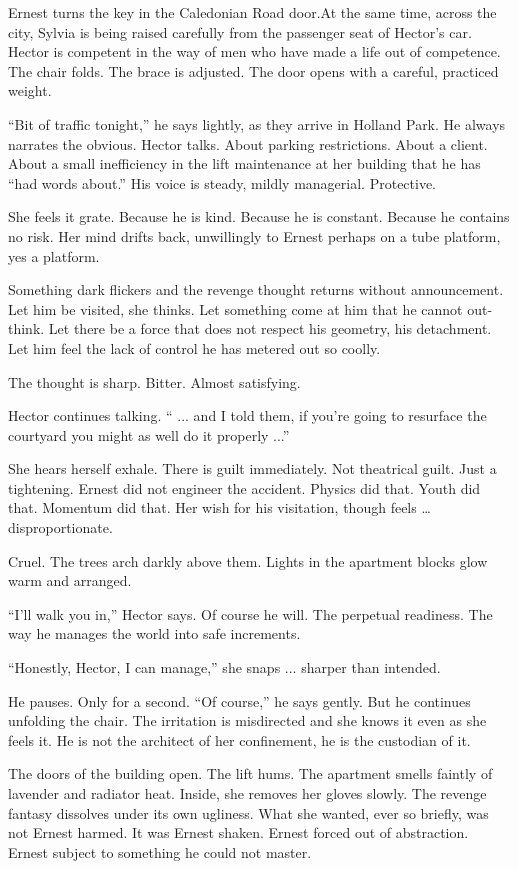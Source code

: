 Ernest turns the key in the Caledonian Road door.At the same time, across the city, Sylvia is being raised carefully from the passenger seat of Hector’s car.
Hector is competent in the way of men who have made a life out of competence. The chair folds. The brace is adjusted. The door opens with a careful, practiced weight.

“Bit of traffic tonight,” he says lightly, as they arrive in Holland Park.
He always narrates the obvious. Hector talks. About parking restrictions. About a client. About a small inefficiency in the lift maintenance at her building that he has “had words about.” His voice is steady, mildly managerial. Protective.

She feels it grate. Because he is kind. Because he is constant. Because he contains no risk. Her mind drifts back, unwillingly to Ernest perhaps on a tube platform, yes a platform.

Something dark flickers and the revenge thought returns without announcement.  Let him be visited, she thinks. Let something come at him that he cannot out-think. Let there be a force that does not respect his geometry, his detachment. Let him feel the lack of control he has metered out so coolly.

The thought is sharp. Bitter. Almost satisfying.

Hector continues talking. “ ... and I told them, if you’re going to resurface the courtyard you might as well do it properly ...”

She hears herself exhale. There is guilt immediately. Not theatrical guilt. Just a tightening. Ernest did not engineer the accident. Physics did that. Youth did that. Momentum did that. Her wish for his visitation, though feels … disproportionate.

Cruel. The trees arch darkly above them. Lights in the apartment blocks glow warm and arranged.

“I’ll walk you in,” Hector says. Of course he will.  The perpetual readiness. The way he manages the world into safe increments.

“Honestly, Hector, I can manage,” she snaps ... sharper than intended.

He pauses. Only for a second. “Of course,” he says gently. But he continues unfolding the chair. The irritation is misdirected and she knows it even as she feels it. He is not the architect of her confinement, he is the custodian of it.

The doors of the building open. The lift hums. The apartment smells faintly of lavender and radiator heat. Inside, she removes her gloves slowly. The revenge fantasy dissolves under its own ugliness. What she wanted, ever so briefly, was not Ernest harmed. It was Ernest shaken. Ernest forced out of abstraction. Ernest subject to something he could not master.

